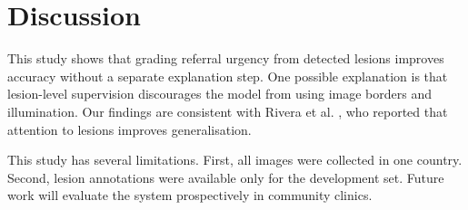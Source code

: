 \section{Discussion}

This study shows that grading referral urgency from detected lesions improves accuracy without a separate explanation step.
One possible explanation is that lesion-level supervision discourages the model from using image borders and illumination.
Our findings are consistent with Rivera et al. \citep{rivera2023attention}, who reported that attention to lesions improves generalisation.

This study has several limitations.
First, all images were collected in one country.
Second, lesion annotations were available only for the development set.
Future work will evaluate the system prospectively in community clinics.
